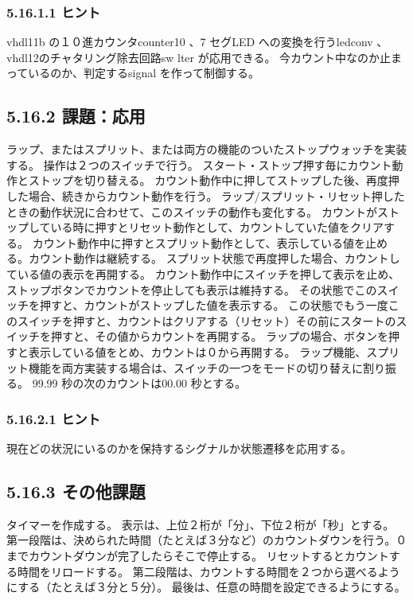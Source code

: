 \documentclass[letterpaper,10pt,dvipdfmx]{sphinxmanual}
\begin{document}
\subsubsection{5.16.1.1 ヒント}
\label{05_try:id27}
vhdl11b の１０進カウンタcounter10 、7 セグLED への変換を行うledconv 、vhdl12のチャタリング除去回路sw lter が応用できる。
今カウント中なのか止まっているのか、判定するsignal を作って制御する。


\subsection{5.16.2 課題：応用}
\label{05_try:id28}
ラップ、またはスプリット、または両方の機能のついたストップウォッチを実装する。
操作は２つのスイッチで行う。
スタート・ストップ押す毎にカウント動作とストップを切り替える。
カウント動作中に押してストップした後、再度押した場合、続きからカウント動作を行う。
ラップ/スプリット・リセット押したときの動作状況に合わせて、このスイッチの動作も変化する。
カウントがストップしている時に押すとリセット動作として、カウントしていた値をクリアする。
カウント動作中に押すとスプリット動作として、表示している値を止める。カウント動作は継続する。
スプリット状態で再度押した場合、カウントしている値の表示を再開する。
カウント動作中にスイッチを押して表示を止め、ストップボタンでカウントを停止しても表示は維持する。
その状態でこのスイッチを押すと、カウントがストップした値を表示する。
この状態でもう一度このスイッチを押すと、カウントはクリアする（リセット）その前にスタートのスイッチを押すと、その値からカウントを再開する。
ラップの場合、ボタンを押すと表示している値をとめ、カウントは０から再開する。
ラップ機能、スプリット機能を両方実装する場合は、スイッチの一つをモードの切り替えに割り振る。
99.99 秒の次のカウントは00.00 秒とする。


\subsubsection{5.16.2.1 ヒント}
\label{05_try:id29}
現在どの状況にいるのかを保持するシグナルか状態遷移を応用する。


\subsection{5.16.3 その他課題}
\label{05_try:id30}
タイマーを作成する。
表示は、上位２桁が「分」、下位２桁が「秒」とする。
第一段階は、決められた時間（たとえば３分など）のカウントダウンを行う。０までカウントダウンが完了したらそこで停止する。
リセットするとカウントする時間をリロードする。
第二段階は、カウントする時間を２つから選べるようにする（たとえば３分と５分）。
最後は、任意の時間を設定できるようにする。
\end{document}
